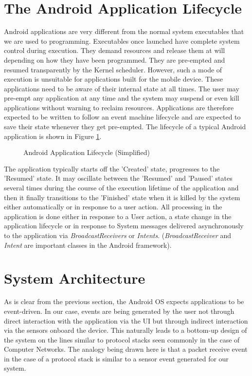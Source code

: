\section{The Android Application Lifecycle\label{sec:android_lifecycle}}

Android applications are very different from the normal system executables
that we are used to programming. Executables once launched have complete 
system control during execution. They demand resources and release them at 
will depending on how they have been programmed. They are pre-empted and 
resumed transparently by the Kernel scheduler. However, such a mode of
execution is unsuitable for applications built for the mobile device. 
These applications need to be aware of their internal state at all times.
The user may pre-empt any application at any time and the system may 
suspend or even kill applications without warning to reclaim resources.
Applications are therefore expected to be written to follow an event machine 
lifecycle and are expected to save their state whenever they get pre-empted. 
The lifecycle of a typical Android application is shown in 
Figure \ref{fig:android_lifecycle}.


\begin{figure}
\caption{Android Application Lifecycle (Simplified)\label{fig:android_lifecycle}}
\end{figure}

The application typically starts off the 'Created' state, progresses 
to the 'Resumed' state. It may oscillate between the 'Resumed' and 'Paused' states
several times during the course of the execution lifetime of the application 
and then it finally transitions to the 'Finished' state when it is killed by 
the system either automatically or in response to a user action. All 
processing in the application is done either in response to a User action, 
a state change in the application lifecycle or in response to System 
messages delivered asynchronously to the application via \emph{BroadcastReceivers} 
or \emph{Intents}. (\emph{BroadcastReceiver} and \emph{Intent} are important
classes in the Android framework).

\section{System Architecture}

As is clear from the previous section, the Android OS expects applications to 
be event-driven. In our case, events are being generated by the user 
not through direct interaction with the application via the UI but through 
indirect interaction via the sensors onboard the device. This naturally 
leads to a bottom-up design of the system on the lines similar to protocol
stacks seen commonly in the case of Computer Networks. The analogy
being drawn here is that a packet receive event in the case of a 
protocol stack is similar to a sensor event generated for our system. 

